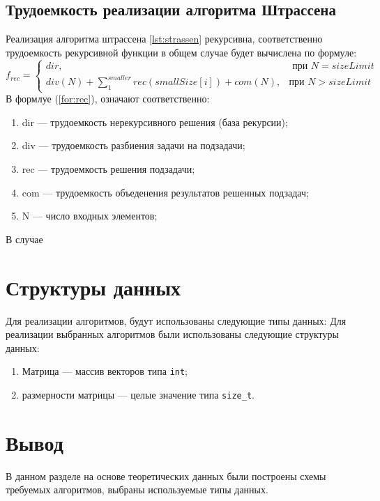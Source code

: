 \subsection{Трудоемкость реализации алгоритма Штрассена}
Реализация алгоритма штрассена \ref{lst:strassen} рекурсивна, соответственно трудоемкость рекурсивной функции в общем случае будет вычислена по формуле:
\begin{equation}
	\label{for:rec}
	f_{rec} =
	\begin{cases}
		dir, & \text{ при $N = sizeLimit$}\\
		div(N) +\sum_{1}^{smaller}{rec(smallSize[i])} + com(N), & \text{при $N> sizeLimit$}
	\end{cases}
\end{equation}
В формлуе (\ref{for:rec}), означают соответственно:
\begin{enumerate}
	\item dir --- трудоемкость нерекурсивного решения (база рекурсии);
	\item div --- трудоемкость разбиения задачи на подзадачи;
	\item rec --- трудоемкость решения подзадачи;
	\item com --- трудоемкость объеденения результатов решенных подзадач;
	\item N --- число входных элементов;
\end{enumerate}


В случае 

\section{Структуры данных}

Для реализации алгоритмов, будут использованы следующие типы данных:
Для реализации выбранных алгоритмов были использованы следующие структуры данных:
\begin{enumerate}
	\item Матрица --- массив векторов типа \texttt{int};
	\item размерности матрицы --- целые значение типа \texttt{size\_t}.
\end{enumerate}



\section*{Вывод}

В данном разделе на основе теоретических данных были построены схемы требуемых алгоритмов, выбраны используемые типы данных.
